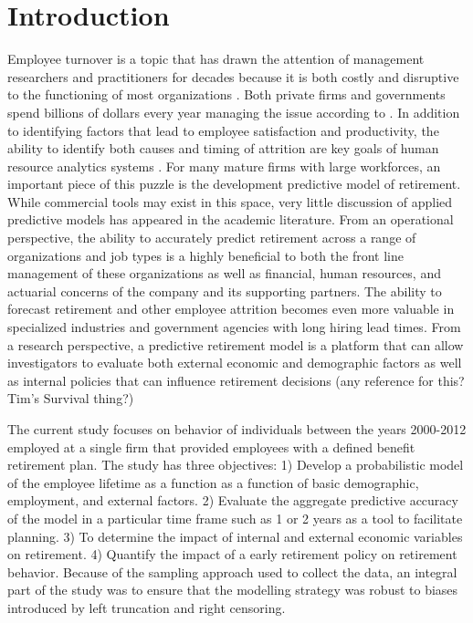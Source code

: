 \documentclass[12pt,letterpaper]{article}
\begin{document}
\section{Introduction}
Employee turnover is a topic that has drawn the attention of management researchers and practitioners for decades because it is both costly and disruptive to the functioning of most organizations \citep{staw1980, mueller1989, kacmar2006}.  Both private firms and governments spend billions of dollars every year managing the issue according to \citet{leonard2001}. In addition to identifying factors that lead to employee satisfaction and  productivity, the ability to identify both causes and timing of attrition are key goals of human resource analytics systems \citep{IBM}. For many mature firms with large workforces, an important piece of this puzzle is the development predictive model of retirement.  While commercial tools may exist in this space, very little discussion of applied predictive models has appeared in the academic literature.  From an operational perspective, the ability to accurately predict retirement across a range of organizations and job types is a highly beneficial to both the front line management of these organizations as well as financial, human resources, and actuarial concerns of the company and its supporting partners. The ability to forecast retirement and other employee attrition becomes even more valuable in specialized industries and government agencies with long hiring lead times. From a research perspective, a predictive retirement model is a platform that can allow investigators to evaluate both external economic and demographic factors as well as internal policies that can influence retirement decisions (any reference for this? Tim's Survival thing?)

The current study focuses on behavior of individuals between the years 2000-2012 employed at a single firm that provided employees with a defined benefit retirement plan.  The study has three objectives: 1) Develop a probabilistic model of the employee lifetime as a function as a function of basic demographic, employment, and external factors.  2) Evaluate the aggregate predictive accuracy of the model in a particular time frame such as 1 or 2 years as a tool to facilitate planning. 3) To determine the impact of internal and external economic variables on retirement. 4) Quantify the impact of a early retirement policy on retirement behavior.  Because of the sampling approach used to collect the data, an integral part of the study was to ensure that the modelling strategy was robust to biases introduced by left truncation and right censoring.
\end{document}
